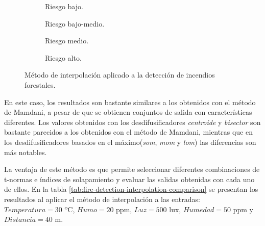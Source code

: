 \begin{figure}[t]
	\centering
	\begin{subfigure}[b]{0.45\textwidth}
		\setlength\figureheight{3cm}
		\setlength\figurewidth{6cm}
		
		\caption{Riesgo bajo.}\label{fig:fire-detection-interpolation-low}
	\end{subfigure}
	\qquad
	\begin{subfigure}[b]{0.45\textwidth}
		\setlength\figureheight{3cm}
		\setlength\figurewidth{6cm}
		
		\caption{Riesgo bajo-medio.}\label{fig:fire-detection-interpolation-low-medium}
	\end{subfigure}
	
	\vspace{1cm}
	\begin{subfigure}[b]{0.45\textwidth}
		\setlength\figureheight{3cm}
		\setlength\figurewidth{6cm}
		
		\caption{Riesgo medio.}\label{fig:fire-detection-interpolation-medium}
	\end{subfigure}
	\qquad
	\begin{subfigure}[b]{0.45\textwidth}
		\setlength\figureheight{3cm}
		\setlength\figurewidth{6cm}
		
		\caption{Riesgo alto.}\label{fig:fire-detection-interpolation-high}
	\end{subfigure}
	\caption{Método de interpolación aplicado a la detección de incendios forestales.}
	\label{fig:interpolation-fire-detection-example}
\end{figure}

En este caso, los resultados son bastante similares a los obtenidos con el método de Mamdani, a pesar de que se obtienen conjuntos de salida con características diferentes. Los valores obtenidos con los desdifusificadores \emph{centroide} y \emph{bisector} son bastante parecidos a los obtenidos con el método de Mamdani, mientras que en los desdifusificadores basados en el máximo(\emph{som}, \emph{mom} y \emph{lom}) las diferencias son más notables.

La ventaja de este método es que permite seleccionar diferentes combinaciones de t-normas e índices de solapamiento y evaluar las salidas obtenidas con cada uno de ellos. En la tabla \ref{tab:fire-detection-interpolation-comparison} se presentan los resultados al aplicar el método de interpolación a las entradas: $Temperatura = 30 \text{ ºC}$, $Humo = 20 \text{ ppm}$, $Luz = 500 \text{ lux}$, $Humedad = 50 \text{ ppm}$ y $Distancia = 40 \text{ m}$.

